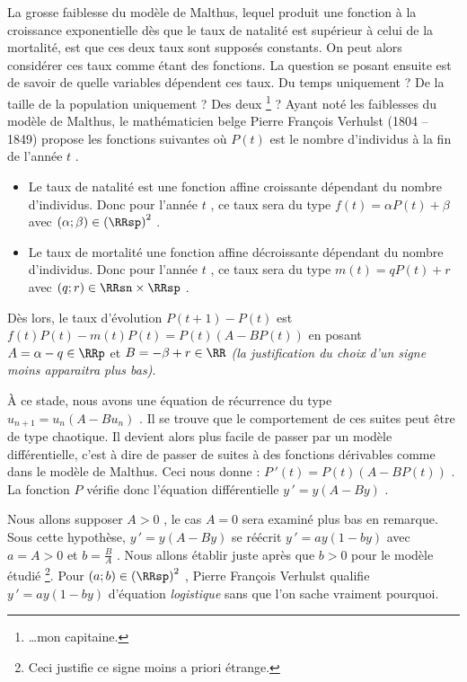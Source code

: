 La grosse faiblesse du modèle de Malthus, lequel produit une fonction à la croissance exponentielle dès que le taux de natalité est supérieur à celui de la mortalité, est que ces deux taux sont supposés constants.
On peut alors considérer ces taux comme étant des fonctions.
La question se posant ensuite est de savoir de quelle variables dépendent ces taux. Du temps uniquement ? De la taille de la population uniquement ? Des deux 
\footnote{
	\dots mon capitaine.
} ?
Ayant noté les faiblesses du modèle de Malthus, le mathématicien belge Pierre François Verhulst (1804 -- 1849) propose les fonctions suivantes où $P(t)$ est le nombre d'individus à la fin de l'année $t$ .

\begin{itemize}[label=\small\textbullet]
	\item Le taux de natalité est une fonction affine croissante dépendant du nombre d'individus.
	Donc pour l'année $t$ , ce taux sera du type $f(t) = \alpha P(t) + \beta$ avec $(\alpha ; \beta) \in \left( \RRsp \right)^2$ .

	\item Le taux de mortalité une fonction affine décroissante dépendant du nombre d'individus.
	Donc pour l'année $t$ , ce taux sera du type $m(t) = q P(t) + r$ avec $(q ; r) \in \RRsn \times \RRsp$ .
\end{itemize}

Dès lors, le taux d'évolution $P(t+1) - P(t)$ est 
$f(t) P(t) - m(t) P(t) = P(t) \left( A - B P(t) \right)$ en posant $A = \alpha - q \in \RRp$ et $B = -\beta + r \in \RR$ \emph{(la justification du choix d'un signe moins apparaitra plus bas)}.


\medskip


À ce stade, nous avons une équation de récurrence du type $u_{n+1} = u_n (A - B u_n)$ . Il se trouve que le comportement de ces suites peut être de type chaotique. Il devient alors plus facile de passer par un modèle différentielle, c'est à dire de passer de suites à des fonctions dérivables comme dans le modèle de Malthus. Ceci nous donne : $P\,'(t) = P(t) \left( A - B P(t) \right)$ . La fonction $P$ vérifie donc l'équation différentielle $y\,' = y (A - B y)$ .


\medskip

Nous allons supposer $A > 0$ , le cas $A = 0$ sera examiné plus bas en remarque. Sous cette hypothèse, $y\,' = y (A - B y)$ se réécrit $y\,' = a y (1 - b y)$ avec $a = A > 0$ et $b = \frac{B}{A}$ . 
Nous allons établir juste après que $b > 0$ pour le modèle étudié
\footnote{
	Ceci justifie ce signe moins a priori étrange.
}.
Pour $(a ; b) \in \left( \RRsp \right)^2$ , Pierre François Verhulst qualifie $y\,' = a y (1 - b y)$ d'équation \emph{\og logistique \fg} sans que l'on sache vraiment pourquoi.


